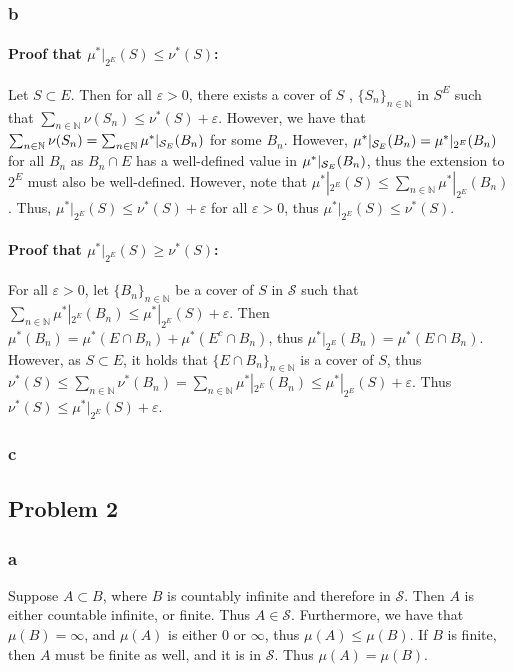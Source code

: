 \documentclass{article}
\theoremstyle{definition}
\numberwithin{theorem}{section}
\numberwithin{equation}{section}
\newcommand{\sig}{\mathcal{S}}
\begin{document}
\subsubsection{b}
\paragraph{Proof that $\mu^*|_{2^E}(S) \leq \nu^*(S)$:}
Let $S \subset E$. Then for all $\varepsilon > 0$, there exists a cover of $S$ , $\lbrace S_n \rbrace_{n \in \mathbb{N}}$ in $S^E$ such that $\sum_{n \in \mathbb{N}} \nu(S_n) \leq \nu^*(S) + \varepsilon$. However, we have that $\sum_{n \in \mathbb{N}} \nu(S_n) = \sum_{n \in \mathbb{N}} \mu^*|_{\mathcal{S}_E}(B_n)$ for some $B_n$. However, $ \mu^*|_{\mathcal{S}_E}(B_n) = \mu^*|_{2^E}(B_n)$ for all $B_n$ as $B_n \cap E$ has a well-defined value in $\mu^*|_{\mathcal{S}_E}(B_n)$, thus the extension to $2^E$ must also be well-defined. However, note that $\mu^*|_{2^E}(S) \leq \sum_{n \in \mathbb{N}} \mu^*|_{2^E}(B_n)$. Thus, $\mu^*|_{2^E}(S) \leq \nu^*(S) + \varepsilon$ for all $\varepsilon > 0$, thus $ \mu^*|_{2^E}(S) \leq \nu^*(S) $.
\paragraph{Proof that $\mu^*|_{2^E}(S) \geq \nu^*(S)$:}
For all $\varepsilon > 0$, let $\lbrace B_n \rbrace_{n \in \mathbb{N}}$ be a cover of $S$ in $\sig$ such that $\sum_{n \in \mathbb{N}}\mu^*|_{2^E}(B_n) \leq \mu^*|_{2^E}(S) + \varepsilon$. Then $\mu^*(B_n) = \mu^*(E \cap B_n) + \mu^*(E^c \cap B_n)$, thus $\mu^*|_{2^E}(B_n) = \mu^*(E \cap B_n)$. However, as $S \subset E$, it holds that $ \lbrace E \cap B_n \rbrace_{n \in \mathbb{N}}$ is a cover of $S$, thus $\nu^*(S) \leq \sum_{n \in \mathbb{N}}\nu^*(B_n) = \sum_{n \in \mathbb{N}}\mu^*|_{2^E}(B_n) \leq \mu^*|_{2^E}(S) + \varepsilon$. Thus $\nu^*(S) \leq \mu^*|_{2^E}(S) + \varepsilon$. 
\subsubsection{c}
\subsection{Problem 2}
\subsubsection{a}
Suppose $A \subset B$, where $B$ is countably infinite and therefore in $\sig$. Then $A$ is either countable infinite, or finite. Thus $A \in \sig$. Furthermore, we have that $\mu(B) = \infty$, and $\mu(A)$ is either $0$ or $\infty$, thus $\mu(A) \leq \mu(B)$. If $B$ is finite, then $A$ must be finite as well, and it is in $\sig$. Thus $\mu(A) = \mu(B)$.
\end{document}
